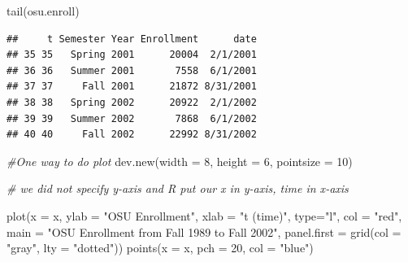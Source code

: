 \documentclass[
]{book}
\newenvironment{Shaded}{\begin{snugshade}}{\end{snugshade}}
\newcommand{\AttributeTok}[1]{\textcolor[rgb]{0.77,0.63,0.00}{#1}}
\newcommand{\CommentTok}[1]{\textcolor[rgb]{0.56,0.35,0.01}{\textit{#1}}}
\newcommand{\DecValTok}[1]{\textcolor[rgb]{0.00,0.00,0.81}{#1}}
\newcommand{\FunctionTok}[1]{\textcolor[rgb]{0.00,0.00,0.00}{#1}}
\newcommand{\NormalTok}[1]{#1}
\newcommand{\OtherTok}[1]{\textcolor[rgb]{0.56,0.35,0.01}{#1}}
\newcommand{\SpecialCharTok}[1]{\textcolor[rgb]{0.00,0.00,0.00}{#1}}
\newcommand{\StringTok}[1]{\textcolor[rgb]{0.31,0.60,0.02}{#1}}
\theoremstyle{definition}
\theoremstyle{definition}
\theoremstyle{definition}
\theoremstyle{definition}
\theoremstyle{remark}
\begin{document}
\begin{Shaded}
\begin{Highlighting}[]
\FunctionTok{tail}\NormalTok{(osu.enroll)}
\end{Highlighting}
\end{Shaded}

\begin{verbatim}
##     t Semester Year Enrollment      date
## 35 35   Spring 2001      20004  2/1/2001
## 36 36   Summer 2001       7558  6/1/2001
## 37 37     Fall 2001      21872 8/31/2001
## 38 38   Spring 2002      20922  2/1/2002
## 39 39   Summer 2002       7868  6/1/2002
## 40 40     Fall 2002      22992 8/31/2002
\end{verbatim}

\begin{Shaded}
\end{Shaded}

\begin{Shaded}
\begin{Highlighting}[]
\CommentTok{\#One way to do plot}
\FunctionTok{dev.new}\NormalTok{(}\AttributeTok{width =} \DecValTok{8}\NormalTok{, }\AttributeTok{height =} \DecValTok{6}\NormalTok{, }\AttributeTok{pointsize =} \DecValTok{10}\NormalTok{) }

\CommentTok{\# we did not specify y{-}axis and R put our x in y{-}axis, time in  x{-}axis}

\FunctionTok{plot}\NormalTok{(}\AttributeTok{x =}\NormalTok{ x, }\AttributeTok{ylab =} \StringTok{"OSU Enrollment"}\NormalTok{, }
       \AttributeTok{xlab =} \StringTok{"t (time)"}\NormalTok{, }\AttributeTok{type=}\StringTok{"l"}\NormalTok{, }\AttributeTok{col =} \StringTok{"red"}\NormalTok{, }
       \AttributeTok{main =} \StringTok{"OSU Enrollment from Fall 1989 to Fall 2002"}\NormalTok{, }
       \AttributeTok{panel.first =} \FunctionTok{grid}\NormalTok{(}\AttributeTok{col =} \StringTok{"gray"}\NormalTok{, }\AttributeTok{lty =} \StringTok{"dotted"}\NormalTok{))}
\FunctionTok{points}\NormalTok{(}\AttributeTok{x =}\NormalTok{ x, }\AttributeTok{pch =} \DecValTok{20}\NormalTok{, }\AttributeTok{col =} \StringTok{"blue"}\NormalTok{)}
\end{Highlighting}
\end{Shaded}
\end{document}

